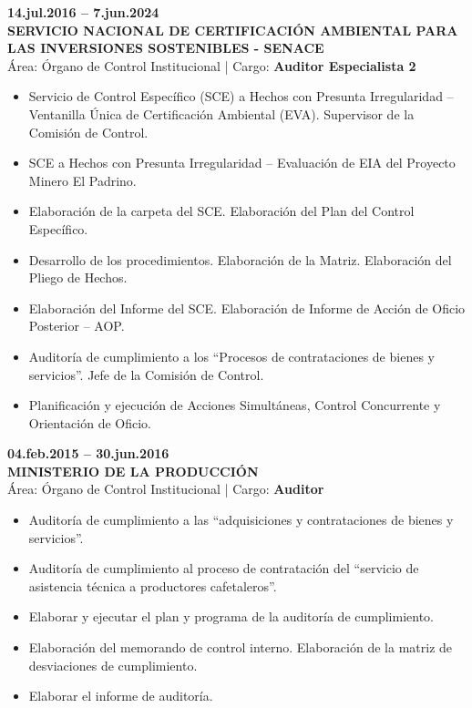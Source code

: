 \documentclass[11pt,a4paper]{article}
\begin{document}
\noindent
\textbf{14.jul.2016 -- 7.jun.2024}\\
\textbf{SERVICIO NACIONAL DE CERTIFICACI\'ON AMBIENTAL PARA LAS INVERSIONES SOSTENIBLES - SENACE}\\
\'Area: \'Organo de Control Institucional \quad | \quad Cargo: \textbf{Auditor Especialista 2}
\begin{itemize}
\item Servicio de Control Espec\'ifico (SCE) a Hechos con Presunta Irregularidad -- Ventanilla \'Unica de Certificaci\'on Ambiental (EVA). Supervisor de la Comisi\'on de Control.
\item SCE a Hechos con Presunta Irregularidad -- Evaluaci\'on de EIA del Proyecto Minero El Padrino.
\item Elaboraci\'on de la carpeta del SCE. Elaboraci\'on del Plan del Control Espec\'ifico.
\item Desarrollo de los procedimientos. Elaboraci\'on de la Matriz. Elaboraci\'on del Pliego de Hechos.
\item Elaboraci\'on del Informe del SCE. Elaboraci\'on de Informe de Acci\'on de Oficio Posterior -- AOP.
\item Auditor\'ia de cumplimiento a los ``Procesos de contrataciones de bienes y servicios''. Jefe de la Comisi\'on de Control.
\item Planificaci\'on y ejecuci\'on de Acciones Simult\'aneas, Control Concurrente y Orientaci\'on de Oficio.
\end{itemize}

\noindent
\textbf{04.feb.2015 -- 30.jun.2016}\\
\textbf{MINISTERIO DE LA PRODUCCI\'ON}\\
\'Area: \'Organo de Control Institucional \quad | \quad Cargo: \textbf{Auditor}
\begin{itemize}
\item Auditor\'ia de cumplimiento a las ``adquisiciones y contrataciones de bienes y servicios''.
\item Auditor\'ia de cumplimiento al proceso de contrataci\'on del ``servicio de asistencia t\'ecnica a productores cafetaleros''.
\item Elaborar y ejecutar el plan y programa de la auditor\'ia de cumplimiento.
\item Elaboraci\'on del memorando de control interno. Elaboraci\'on de la matriz de desviaciones de cumplimiento.
\item Elaborar el informe de auditor\'ia.
\end{itemize}
\end{document}
